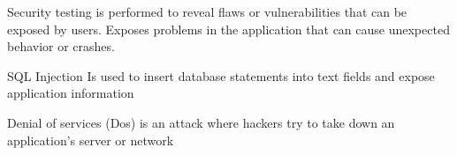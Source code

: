 Security testing 
  is performed to reveal flaws or vulnerabilities that can be exposed by users. 
  Exposes problems in the application that can cause unexpected behavior or crashes. 

SQL Injection 
  Is used to insert database statements into text fields and expose application information 

Denial of services (Dos)
is an attack where hackers try to take down an application's server or network 